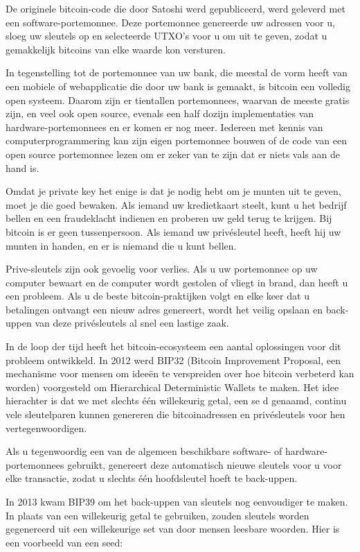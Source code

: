 De originele bitcoin-code die door Satoshi werd gepubliceerd, werd geleverd met een software-portemonnee. Deze portemonnee genereerde uw adressen voor u, sloeg uw sleutels op en selecteerde UTXO's voor u om uit te geven, zodat u gemakkelijk bitcoins van elke waarde kon versturen. 

In tegenstelling tot de portemonnee van uw bank, die meestal de vorm heeft van een mobiele of webapplicatie die door uw bank is gemaakt, is bitcoin een volledig open systeem. Daarom zijn er tientallen portemonnees, waarvan de meeste gratis zijn, en veel ook open source, evenals een half dozijn implementaties van hardware-portemonnees en er komen er nog meer. Iedereen met kennis van computerprogrammering kan zijn eigen portemonnee bouwen of de code van een open source portemonnee lezen om er zeker van te zijn dat er niets vals aan de hand is. 

Omdat je private key het enige is dat je nodig hebt om je munten uit te geven, moet je die goed bewaken. Als iemand uw kredietkaart steelt, kunt u het bedrijf bellen en een fraudeklacht indienen en proberen uw geld terug te krijgen. Bij bitcoin is er geen tussenpersoon. Als iemand uw privésleutel heeft, heeft hij uw munten in handen, en er is niemand die u kunt bellen. 

Prive-sleutels zijn ook gevoelig voor verlies. Als u uw portemonnee op uw computer bewaart en de computer wordt gestolen of vliegt in brand, dan heeft u een probleem. Als u de beste bitcoin-praktijken volgt en elke keer dat u betalingen ontvangt een nieuw adres genereert, wordt het veilig opslaan en back-uppen van deze privésleutels al snel een lastige zaak. 

In de loop der tijd heeft het bitcoin-ecosysteem een aantal oplossingen voor dit probleem ontwikkeld. In 2012 werd BIP32 (Bitcoin Improvement Proposal, een mechanisme voor mensen om ideeën te verspreiden over hoe bitcoin verbeterd kan worden) voorgesteld om Hierarchical Deterministic Wallets te maken. Het idee hierachter is dat we met slechts één willekeurig getal, een se d genaamd, continu vele sleutelparen kunnen genereren die bitcoinadressen en privésleutels voor hen vertegenwoordigen. 

Als u tegenwoordig een van de algemeen beschikbare software- of hardware-portemonnees gebruikt, genereert deze automatisch nieuwe sleutels voor u voor elke transactie, zodat u slechts één hoofdsleutel hoeft te back-uppen. 

In 2013 kwam BIP39 om het back-uppen van sleutels nog eenvoudiger te maken. In plaats van een willekeurig getal te gebruiken, zouden sleutels worden gegenereerd uit een willekeurige set van door mensen leesbare woorden. Hier is een voorbeeld van een seed:

